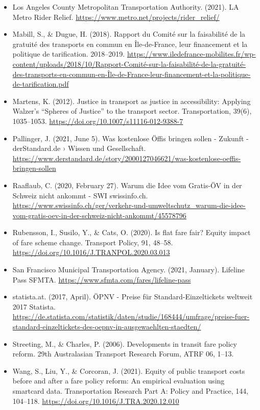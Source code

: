 \documentclass[
]{book}
\begin{document}
\begin{itemize}
\item
  Los Angeles County Metropolitan Transportation Authority. (2021). LA Metro Rider Relief. \url{https://www.metro.net/projects/rider_relief/}
\item
  Mabill, S., \& Dugue, H. (2018). Rapport du Comité sur la faisabilité de la gratuité des transports en commun en Île-de-France, leur financement et la politique de tarification. 2018--2019. \url{https://www.iledefrance-mobilites.fr/wp-content/uploads/2018/10/Rapport-Comité-sur-la-faisabilité-de-la-gratuité-des-transports-en-commun-en-Île-de-France-leur-financement-et-la-politique-de-tarification.pdf}
\item
  Martens, K. (2012). Justice in transport as justice in accessibility: Applying Walzer's ``Spheres of Justice'' to the transport sector. Transportation, 39(6), 1035--1053. \url{https://doi.org/10.1007/s11116-012-9388-7}
\item
  Pallinger, J. (2021, June 5). Was kostenlose Öffis bringen sollen - Zukunft - derStandard.de › Wissen und Gesellschaft. \url{https://www.derstandard.de/story/2000127046621/was-kostenlose-oeffis-bringen-sollen}
\item
  Raaflaub, C. (2020, February 27). Warum die Idee vom Gratis-ÖV in der Schweiz nicht ankommt - SWI swissinfo.ch. \url{https://www.swissinfo.ch/ger/verkehr-und-umweltschutz_warum-die-idee-vom-gratis-oev-in-der-schweiz-nicht-ankommt/45578796}
\item
  Rubensson, I., Susilo, Y., \& Cats, O. (2020). Is flat fare fair? Equity impact of fare scheme change. Transport Policy, 91, 48--58. \url{https://doi.org/10.1016/J.TRANPOL.2020.03.013}
\item
  San Francisco Municipal Transportation Agency. (2021, January). Lifeline Pass \textbar{} SFMTA. \url{https://www.sfmta.com/fares/lifeline-pass}
\item
  statista.at. (2017, April). ÖPNV - Preise für Standard-Einzeltickets weltweit 2017 \textbar{} Statista. \url{https://de.statista.com/statistik/daten/studie/168444/umfrage/preise-fuer-standard-einzeltickets-des-oepnv-in-ausgewaehlten-staedten/}
\item
  Streeting, M., \& Charles, P. (2006). Developments in transit fare policy reform. 29th Australasian Transport Research Forum, ATRF 06, 1--13.
\item
  Wang, S., Liu, Y., \& Corcoran, J. (2021). Equity of public transport costs before and after a fare policy reform: An empirical evaluation using smartcard data. Transportation Research Part A: Policy and Practice, 144, 104--118. \url{https://doi.org/10.1016/J.TRA.2020.12.010}

\end{itemize}
\end{document}
